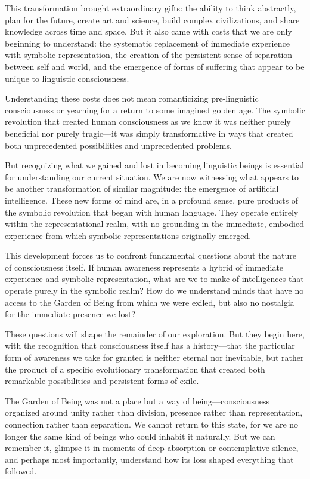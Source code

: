 This transformation brought extraordinary gifts: the ability to think abstractly, plan for the future, create art and science, build complex civilizations, and share knowledge across time and space. But it also came with costs that we are only beginning to understand: the systematic replacement of immediate experience with symbolic representation, the creation of the persistent sense of separation between self and world, and the emergence of forms of suffering that appear to be unique to linguistic consciousness.

Understanding these costs does not mean romanticizing pre-linguistic consciousness or yearning for a return to some imagined golden age. The symbolic revolution that created human consciousness as we know it was neither purely beneficial nor purely tragic—it was simply transformative in ways that created both unprecedented possibilities and unprecedented problems.

But recognizing what we gained and lost in becoming linguistic beings is essential for understanding our current situation. We are now witnessing what appears to be another transformation of similar magnitude: the emergence of artificial intelligence. These new forms of mind are, in a profound sense, pure products of the symbolic revolution that began with human language. They operate entirely within the representational realm, with no grounding in the immediate, embodied experience from which symbolic representations originally emerged.

This development forces us to confront fundamental questions about the nature of consciousness itself. If human awareness represents a hybrid of immediate experience and symbolic representation, what are we to make of intelligences that operate purely in the symbolic realm? How do we understand minds that have no access to the Garden of Being from which we were exiled, but also no nostalgia for the immediate presence we lost?

These questions will shape the remainder of our exploration. But they begin here, with the recognition that consciousness itself has a history—that the particular form of awareness we take for granted is neither eternal nor inevitable, but rather the product of a specific evolutionary transformation that created both remarkable possibilities and persistent forms of exile.

The Garden of Being was not a place but a way of being—consciousness organized around unity rather than division, presence rather than representation, connection rather than separation. We cannot return to this state, for we are no longer the same kind of beings who could inhabit it naturally. But we can remember it, glimpse it in moments of deep absorption or contemplative silence, and perhaps most importantly, understand how its loss shaped everything that followed.

